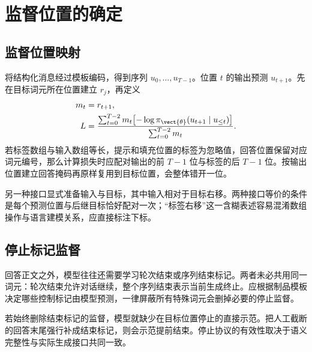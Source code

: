 \documentclass[../textbook.tex]{subfiles}
\begin{document}
\section{监督位置的确定}

\subsection{监督位置映射}
将结构化消息经过模板编码，得到序列 $u_0,\ldots,u_{T-1}$。位置 $t$ 的输出预测 $u_{t+1}$。先在目标词元所在位置建立 $r_j$，再定义
\begin{equation}\label{eq:sft-shift-mask}
 \begin{aligned}
  m_t &= r_{t+1}, \\
  L &= \frac{\sum_{t=0}^{T-2}m_t\bigl[-\log\pi_{\vect{\theta}}(u_{t+1}\mid u_{\le t})\bigr]}
  {\sum_{t=0}^{T-2}m_t}.
 \end{aligned}
\end{equation}
若标签数组与输入数组等长，提示和填充位置的标签为忽略值，回答位置保留对应词元编号，那么计算损失时应配对输出的前 $T-1$ 位与标签的后 $T-1$ 位。按输出位置建立回答掩码再原样复用到目标位置，会整体错开一位。


另一种接口显式准备输入与目标，其中输入相对于目标右移。两种接口等价的条件是每个预测位置与后继目标恰好配对一次；“标签右移”这一含糊表述容易混淆数组操作与语言建模关系，应直接标注下标。

\subsection{停止标记监督}
回答正文之外，模型往往还需要学习轮次结束或序列结束标记。两者未必共用同一词元：轮次结束允许对话继续，整个序列结束表示当前生成终止。应根据制品模板决定哪些控制标记由模型预测，一律屏蔽所有特殊词元会删掉必要的停止监督。

若始终删除结束标记的监督，模型就缺少在目标位置停止的直接示范。把人工截断的回答末尾强行补成结束标记，则会示范提前结束。停止协议的有效性取决于语义完整性与实际生成接口共同一致。
\end{document}
